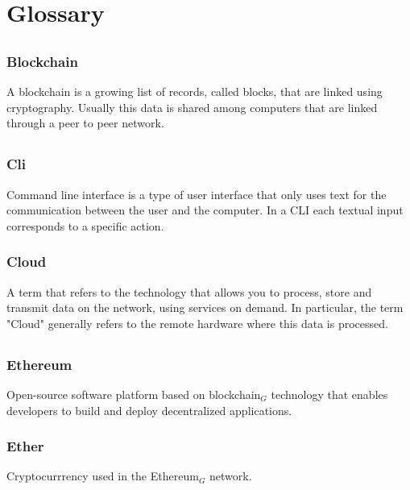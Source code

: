 \section{Glossary}

	\subsection*{}
		\subsubsection*{Blockchain}
			A blockchain is a growing list of records, called blocks, that are linked using cryptography. Usually this data is shared among computers that are linked through a peer to peer network. 

	\subsection*{}
		\subsubsection*{Cli}
			Command line interface is a type of user interface that only uses text for the communication between the user and the computer. In a CLI each textual input corresponds to a specific action.
		
		\subsubsection*{Cloud}
			A term that refers to the technology that allows you to process, store and transmit data on the network, using services on demand. In particular, the term "Cloud" generally refers to the remote hardware where this data is processed.

	\subsection*{}
		\subsubsection*{Ethereum}
			Open-source software platform based on blockchain$_{G}$ technology that enables developers to build and deploy decentralized applications. 
			
		\subsubsection*{Ether}
			Cryptocurrrency used in the Ethereum$_{G}$ network. 
	
